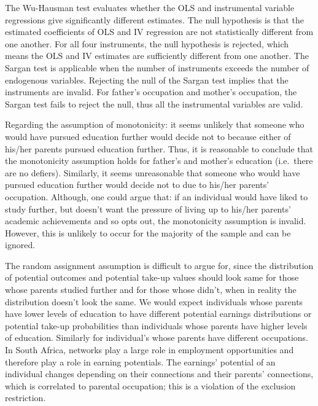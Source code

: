 \documentclass[11pt,preprint, authoryear]{elsarticle}
\numberwithin{equation}{section}
\numberwithin{figure}{section}
\numberwithin{table}{section}
\begin{document}
The Wu-Hausman test evaluates whether the OLS and instrumental variable
regressions give significantly different estimates. The null hypothesis
is that the estimated coefficients of OLS and IV regression are not
statistically different from one another. For all four instruments, the
null hypothesis is rejected, which means the OLS and IV estimates are
sufficiently different from one another. The Sargan test is applicable
when the number of instruments exceeds the number of endogenous
variables. Rejecting the null of the Sargan test implies that the
instruments are invalid. For father's occupation and mother's
occupation, the Sargan test fails to reject the null, thus all the
instrumental variables are valid.

Regarding the assumption of monotonicity: it seems unlikely that someone
who would have pursued education further would decide not to because
either of his/her parents pursued education further. Thus, it is
reasonable to conclude that the monotonicity assumption holds for
father's and mother's education (i.e.~there are no defiers). Similarly,
it seems unreasonable that someone who would have pursued education
further would decide not to due to his/her parents' occupation.
Although, one could argue that: if an individual would have liked to
study further, but doesn't want the pressure of living up to his/her
parents' academic achievements and so opts out, the monotonicity
assumption is invalid. However, this is unlikely to occur for the
majority of the sample and can be ignored.

The random assignment assumption is difficult to argue for, since the
distribution of potential outcomes and potential take-up values should
look same for those whose parents studied further and for those whose
didn't, when in reality the distribution doesn't look the same. We would
expect individuals whose parents have lower levels of education to have
different potential earnings distributions or potential take-up
probabilities than individuals whose parents have higher levels of
education. Similarly for individual's whose parents have different
occupations. In South Africa, networks play a large role in employment
opportunities and therefore play a role in earning potentials. The
earnings' potential of an individual changes depending on their
connections and their parents' connections, which is correlated to
parental occupation; this is a violation of the exclusion restriction.
\end{document}
